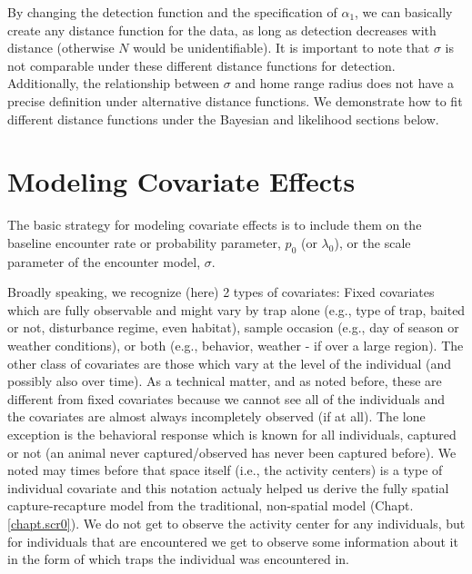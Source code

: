 By changing the detection function and the specification of
$\alpha_1$, we can basically create any distance function for the
data, as long as detection decreases with distance (otherwise $N$ would be unidentifiable).
It is important to note that $\sigma$ is not comparable under
these different distance functions for detection.  Additionally, the
relationship between $\sigma$ and home range radius does not have
a precise definition under alternative distance functions.  We
demonstrate how to fit different distance functions under the Bayesian
and likelihood sections below.


\section{Modeling Covariate Effects}


The basic strategy for modeling covariate effects is to include them
on the baseline encounter rate or probability parameter, $p_{0}$ (or
$\lambda_{0}$), or the scale parameter of the encounter model,
$\sigma$.

Broadly speaking, we recognize (here) 2 types of covariates: Fixed
covariates which are fully observable and might vary by trap alone (e.g.,
type of trap, baited or not, disturbance regime, even habitat), sample
occasion (e.g., day of season or weather conditions), or both (e.g.,
behavior, weather - if over a large region).  The other class of
covariates are those which vary at the level of the individual (and
possibly also over time).  As a technical matter, and as noted before, these are different
from fixed covariates because we cannot see all of the individuals and
the covariates are almost always incompletely observed (if at all).
The lone exception is the behavioral response which is known for all
individuals, captured or not (an animal never captured/observed has never been captured before).  We noted may times before that space
itself (i.e., the activity centers) is a type of individual
covariate and this notation actualy helped us derive the fully spatial capture-recapture model from the traditional, non-spatial model (Chapt. \ref{chapt.scr0}). We do not get to observe the activity center for any
individuals, but for individuals that are encountered we get to
observe some information about it in the form of which traps the
individual was encountered in.


